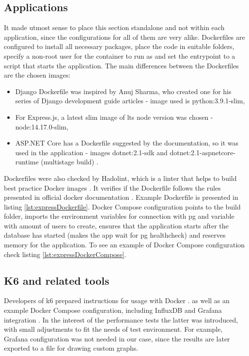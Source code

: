 \subsection{Applications}
It made utmost sense to place this section standalone and not within each application, since the configurations for all of them are very alike.
Dockerfiles are configured to install all necessary packages, place the code in suitable folders, specify a non-root user for the container to run as and set the entrypoint to a script that starts the application.
The main differences between the Dockerfiles are the chosen images:
\begin{itemize}
    \item Django Dockerfile was inspired by Anuj Sharma, who created one for his series of Django development guide articles \cite{djangoDockerfile} - image used is python:3.9.1-slim,
    \item For Express.js, a latest slim image of \acrshort{lts} node version was chosen - node:14.17.0-slim,
    \item ASP.NET Core has a Dockerfile suggested by the documentation, so it was used in the application - images dotnet:2.1-sdk and dotnet:2.1-aspnetcore-runtime (multistage build) \cite{aspnetDockerfile}.
\end{itemize}
Dockerfiles were also checked by Hadolint, which is a linter that helps to build best practice Docker images \cite{hadolintGit}.
It verifies if the Dockerfile follows the rules presented in official docker documentation \cite{dockerBestPractices}.
Example Dockerfile is presented in listing \ref{lst:expressDockerfile}.
Docker Compose configuration points to the build folder, imports the environment variables for connection with \acrshort{pg} and variable with amount of users to create, ensures that the application starts after the database has started (makes the app wait for \acrlong{pg} healthcheck) and reserves memory for the application. To see an example of Docker Compose configuration check listing \ref{lst:expressDockerCompose}.



\subsection{K6 and related tools}
Developers of k6 prepared instructions for usage with Docker \cite{k6RunningLocalTests}.
as well as an example Docker Compose configuration, including InfluxDB and Grafana integration \cite{k6DockerCompose}.
In the interest of the performance tests the latter was introduced, with small adjustments to fit the needs of test environment. For example, Grafana configuration was not needed in our case, since the results are later exported to a file for drawing custom graphs.

